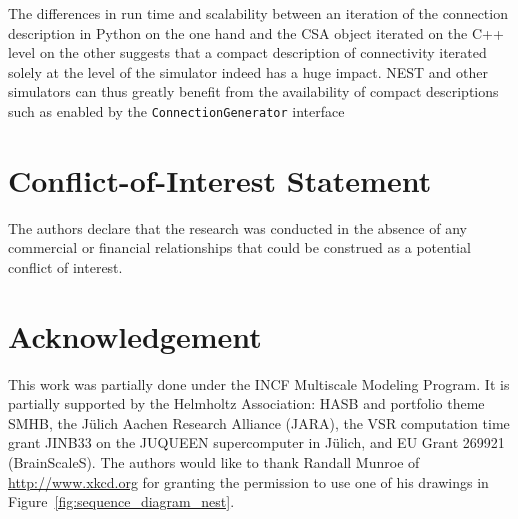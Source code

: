 \documentclass{frontiersSCNS} %
\begin{document}
The differences in run time and scalability between an iteration of
the connection description in Python on the one hand and the CSA
object iterated on the C++ level on the other suggests that a compact
description of connectivity iterated solely at the level of the
simulator indeed has a huge impact. NEST and other simulators can thus
greatly benefit from the availability of compact descriptions such as
enabled by the \verb|ConnectionGenerator| interface


\section*{Conflict-of-Interest Statement}
The authors declare that the research was conducted in the absence of
any commercial or financial relationships that could be construed as a
potential conflict of interest.

\section*{Acknowledgement}
This work was partially done under the INCF Multiscale Modeling
Program. It is partially supported by the Helmholtz Association: HASB
and portfolio theme SMHB, the Jülich Aachen Research Alliance (JARA),
the VSR computation time grant JINB33 on the JUQUEEN supercomputer in
Jülich, and EU Grant 269921 (BrainScaleS). The authors would like to
thank Randall Munroe of \url{http://www.xkcd.org} for granting the
permission to use one of his drawings in
Figure~\ref{fig:sequence_diagram_nest}.



\end{document}
